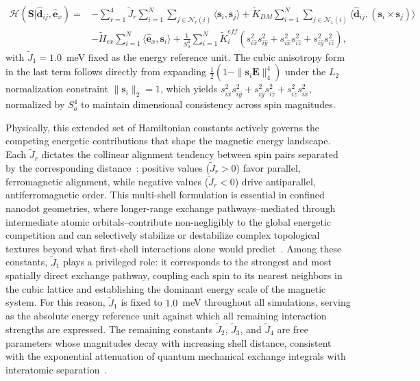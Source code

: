 \documentclass[letterpaper, 12, one column]{article}
\begin{document}
\begin{equation}\label{eq:Hamiltonian}
\begin{aligned}
\mathcal{H}\left(\mathbf{S}|\hat{\mathbf{d}}_{ij},\hat{\mathbf{e}}_x\right) =
&- \sum_{r=1}^{4}\tilde{J}_r
    \sum_{i=1}^{N}\sum_{j\in \mathcal{N}_r(i)}
    \langle \mathbf{s}_i, \mathbf{s}_j \rangle + \tilde{K}_{DM} \sum_{i=1}^{N}\sum_{j\in \mathcal{N}_1(i)}
    \langle \hat{\mathbf{d}}_{ij},(\mathbf{s}_i \times \mathbf{s}_j)
    \rangle \\
&- \tilde{H}_{ex} \sum_{i=1}^{N}
    \langle \hat{\mathbf{e}}_x, \mathbf{s}_i \rangle + \frac{1}{S_o^4}\sum_{i=1}^{N} \tilde{K}_i^{eff}
    \left(s_{i\hat{x}}^2 s_{i\hat{y}}^2 +
          s_{i\hat{x}}^2 s_{i\hat{z}}^2 +
          s_{i\hat{y}}^2 s_{i\hat{z}}^2\right),
\end{aligned}
\end{equation}
with $\tilde{J}_1 = 1.0$~meV fixed as the energy reference unit. The cubic anisotropy form in the last term follows directly from expanding $\frac{1}{2}(1 - \|\mathbf{s}_i\mathbf{E}\|_4^4)$ under the $L_2$ normalization constraint $\|\mathbf{s}_i\|_2 = 1$, which 
yields $s_{i\hat{x}}^2 s_{i\hat{y}}^2 + s_{i\hat{y}}^2 
s_{i\hat{z}}^2 + s_{i\hat{z}}^2 s_{i\hat{x}}^2$, normalized by $S_o^4$ to maintain dimensional consistency across spin magnitudes.

Physically, this extended set of Hamiltonian constants actively governs the competing energetic contributions that shape the magnetic energy landscape. Each $\tilde{J}_r$ dictates the collinear alignment tendency between spin pairs separated by the corresponding distance~\cite{coey2010magnetism}: positive values ($\tilde{J}_r > 0$) favor parallel, ferromagnetic 
alignment, while negative values ($\tilde{J}_r < 0$) drive 
antiparallel, antiferromagnetic order. This multi-shell formulation is essential in confined nanodot geometries, where longer-range exchange pathways--mediated through intermediate atomic orbitals--contribute non-negligibly to the global energetic competition and can selectively stabilize or destabilize complex topological textures beyond what first-shell interactions alone would predict~\cite{eriksson2017atomistic}. Among these constants, $\tilde{J}_1$ plays a privileged role: it 
corresponds to the strongest and most spatially direct exchange pathway, coupling each spin to its nearest neighbors in the cubic lattice and establishing the dominant energy scale of the magnetic system. For this reason, $\tilde{J}_1$ is fixed to $1.0$~meV throughout all simulations, serving as the absolute energy reference unit against which all remaining interaction strengths are expressed. The remaining constants $\tilde{J}_2$, $\tilde{J}_3$, and $\tilde{J}_4$ are free parameters whose magnitudes decay with increasing shell distance, consistent with the exponential attenuation of quantum mechanical exchange integrals with interatomic separation~\cite{coey2010magnetism}.
\end{document}
